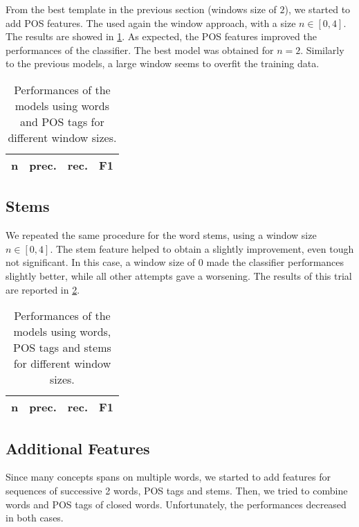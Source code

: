 From the best template in the previous section (windows size of $2$), we started to add \ac{POS} features.
The used again the window approach, with a size $n \in [0,4]$.
The results are showed in \cref{tab:pos}.
As expected, the \ac{POS} features improved the performances of the classifier.
The best model was obtained for $n = 2$.
Similarly to the previous models, a large window seems to overfit the training data.

\begin{table}[h]
	\centering
    \begin{tabular}{ c c c c }
    	\toprule
    		\multicolumn{1}{c}{n} & \multicolumn{1}{c}{prec.} & \multicolumn{1}{c}{rec.} & \multicolumn{1}{c}{F1} \\
    	\midrule
            
    	\bottomrule
	\end{tabular}
    \caption{Performances of the models using words and POS tags for different window sizes.}
	\label{tab:pos}
\end{table}

\subsection{Stems}
\label{subsection:stems}
We repeated the same procedure for the word stems, using a window size $n \in [0,4]$.
The stem feature helped to obtain a slightly improvement, even tough not significant.
In this case, a window size of $0$ made the classifier performances slightly better, while all other attempts gave a worsening.
The results of this trial are reported in \cref{tab:stems}.

\begin{table}[h]
	\centering
    \begin{tabular}{ c c c c }
    	\toprule
    		\multicolumn{1}{c}{n} & \multicolumn{1}{c}{prec.} & \multicolumn{1}{c}{rec.} & \multicolumn{1}{c}{F1} \\
    	\midrule
            
    	\bottomrule
	\end{tabular}
    \caption{Performances of the models using words, POS tags and stems for different window sizes.}
	\label{tab:stems}
\end{table}

\subsection{Additional Features}
\label{subsection:additional}
Since many concepts spans on multiple words, we started to add features for sequences of successive 2 words, \ac{POS} tags and stems.
Then, we tried to combine words and \ac{POS} tags of closed words.
Unfortunately, the performances decreased in both cases.

